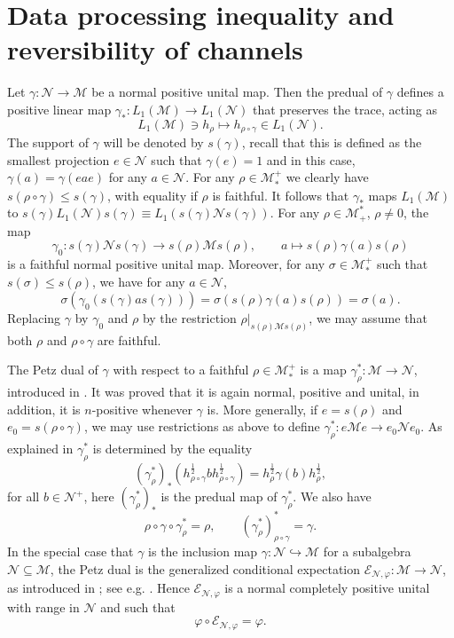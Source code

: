 \documentclass[12pt]{article}
\theoremstyle{definition}
\theoremstyle{remark}
\numberwithin{equation}{section}
\def\cE{\mathcal E}
\def\Me{\mathcal M}
\def\Ne{\mathcal N}
\begin{document}
\section{Data processing inequality and reversibility of channels}

Let  $\gamma: \Ne\to \Me$ be a normal positive unital map. Then the  predual of $\gamma$  defines a 
positive linear map $\gamma_*: L_1(\Me)\to L_1(\Ne)$ that preserves the trace, acting as
\[
L_1(\Me)\ni h_\rho\mapsto h_{\rho\circ\gamma} \in L_1(\Ne).
\]
The support
of $\gamma$ will be denoted by $s(\gamma)$, recall that this is defined as the smallest projection
$e\in \Ne$ such that $\gamma(e)=1$ and in this case, $\gamma(a)=\gamma(eae)$ for any $a\in
\Ne$. For any $\rho\in \Me_*^+$ we clearly have
$s(\rho\circ\gamma)\le s(\gamma)$, with equality if $\rho$ is faithful. 
It follows that $\gamma_*$ maps $L_1(\Me)$ to $s(\gamma)L_1(\Ne)s(\gamma)\equiv
L_1(s(\gamma)\Ne s(\gamma))$.  For any $\rho\in \Me_+^*$, $\rho\ne 0$, the map
\[
\gamma_0: s(\gamma)\Ne s(\gamma)\to s(\rho)\Me s(\rho),\qquad a\mapsto s(\rho) \gamma(a)s(\rho)
\]
is a faithful normal positive unital map. Moreover, for any $\sigma\in \Me_*^+$ such that
$s(\sigma)\le s(\rho)$, we have for any $a\in \Ne$,
\[
\sigma(\gamma_0(s(\gamma)as(\gamma)))=\sigma(s(\rho)\gamma(a)s(\rho))=\sigma(a).
\]
Replacing $\gamma$ by $\gamma_0$ and $\rho$ by the restriction $\rho|_{s(\rho)\Me
s(\rho)}$, we may  assume that both $\rho$ and $\rho\circ
\gamma$ are faithful.


The Petz dual  of $\gamma$ with respect to a faithful  $\rho\in \Me_*^+$
is a map $\gamma_\rho^*:\Me\to \Ne$,
introduced in \cite{petz1988sufficiency}. It was proved that it is again
normal, positive and unital, in addition, it is $n$-positive whenever $\gamma$ is. More generally, if $e=s(\rho)$ and $e_0=s(\rho\circ\gamma)$, we may use restrictions as
above to define $\gamma^*_\rho: e\Me e\to e_0\Ne e_0$. 
As explained in \cite{jencova2018renyi} $\gamma^*_\rho$ is determined by the equality
\begin{equation}\label{eq:petzdual}
(\gamma^*_\rho)_*(h_{\rho\circ\gamma}^{\frac12}bh_{\rho\circ\gamma}^{\frac12})=h_\rho^{\frac12}\gamma(b)h_\rho^{\frac12},
\end{equation}
for all $b\in \Ne^+$, here $(\gamma^*_\rho)_*$ is the predual map of $\gamma^*_\rho$. We
also have
\[
\rho\circ\gamma\circ\gamma^*_\rho=\rho,\qquad (\gamma_\rho^*)_{\rho\circ\gamma}^*=\gamma.
\]
In the special case that $\gamma$ is the
inclusion map $\gamma: \Ne\hookrightarrow \Me$ for a subalgebra $\Ne\subseteq \Me$, the Petz dual is the generalized 
conditional expectation $\cE_{\Ne,\varphi}:\Me\to \Ne$, as introduced in
\cite{accardi1982conditional}; see e.g.
\cite[Proposition 6.5]{hiai2021quantum}. Hence  $\cE_{\Ne,\varphi}$ is a normal completely
positive unital with range in $\Ne$ and such that 
\[
\varphi\circ \cE_{\Ne,\varphi}=\varphi.
\]
\end{document}
